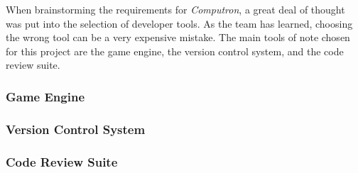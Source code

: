 When brainstorming the requirements for \textit{Computron}, a great deal of thought was put into the selection of developer tools. As the team has learned, choosing the wrong tool can be a very expensive mistake. The main tools of note chosen for this project are the game engine, the version control system, and the code review suite.

\subsubsection{Game Engine} \label{game_engine}


\subsubsection{Version Control System}


\subsubsection{Code Review Suite}

